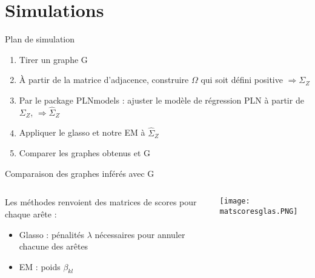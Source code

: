 \documentclass[11pt]{bredelebeamer}
\begin{document}
 \section{Simulations}
 \begin{frame}{Plan de simulation}
 \begin{enumerate}
     \item Tirer un graphe G \vspace{0.3cm}
     \item \`{A} partir de la matrice d'adjacence, construire $\Omega$ qui soit défini positive\vspace{0.3cm} $\Rightarrow \Sigma_Z$
     \item Par le package {\selectfont
PLNmodels} : ajuster le modèle de régression PLN à partir de $\Sigma_Z$, $\Rightarrow \hat{\Sigma}_Z$\vspace{0.3cm}
   
     \item Appliquer le glasso et notre EM à $\hat{\Sigma}_Z$\vspace{0.3cm}
     \item Comparer les graphes obtenus et G
 \end{enumerate}
     
 \end{frame}
  \begin{frame}{Comparaison des graphes inférés avec G}
 
 \begin{columns}
 \begin{column}{0.7\linewidth}
 Les méthodes renvoient des matrices de scores pour chaque arête :
 \begin{itemize}
       
             \item Glasso : pénalités $\lambda$ nécessaires pour annuler chacune des arêtes
             \item EM : poids $\beta_{kl}$ 
     \end{itemize}
 \end{column}
 \begin{column}{0.3\linewidth}
 \texttt{[image: matscoresglas.PNG]}
 \end{column}
 \end{columns}
     
 \end{frame}
 
\end{document}
